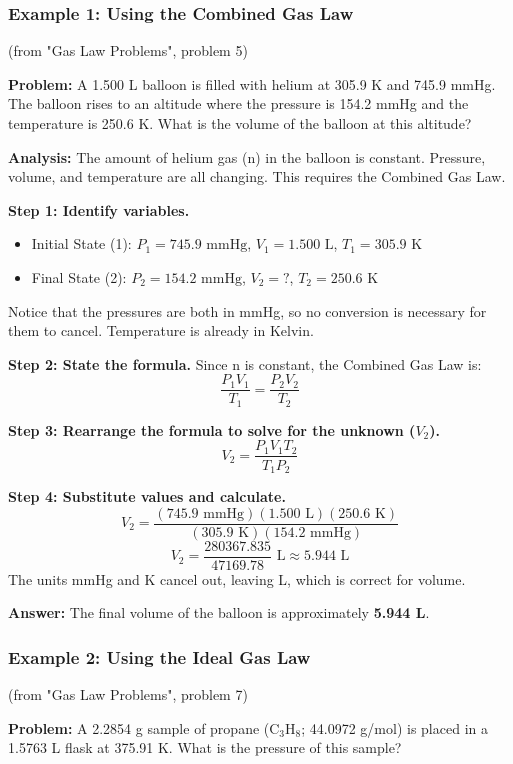\documentclass{article}
\begin{document}
\subsubsection{Example 1: Using the Combined Gas Law}
(from "Gas Law Problems", problem 5)

\textbf{Problem:} A 1.500 L balloon is filled with helium at 305.9 K and 745.9 mmHg. The balloon rises to an altitude where the pressure is 154.2 mmHg and the temperature is 250.6 K. What is the volume of the balloon at this altitude?

\textbf{Analysis:} The amount of helium gas (n) in the balloon is constant. Pressure, volume, and temperature are all changing. This requires the Combined Gas Law.

\textbf{Step 1: Identify variables.}
\begin{itemize}
    \item Initial State (1): $P_1 = 745.9 \text{ mmHg}$, $V_1 = 1.500 \text{ L}$, $T_1 = 305.9 \text{ K}$
    \item Final State (2): $P_2 = 154.2 \text{ mmHg}$, $V_2 = ?$, $T_2 = 250.6 \text{ K}$
\end{itemize}
Notice that the pressures are both in mmHg, so no conversion is necessary for them to cancel. Temperature is already in Kelvin.

\textbf{Step 2: State the formula.}
Since n is constant, the Combined Gas Law is:
\[ \frac{P_1V_1}{T_1} = \frac{P_2V_2}{T_2} \]

\textbf{Step 3: Rearrange the formula to solve for the unknown ($V_2$).}
\[ V_2 = \frac{P_1V_1T_2}{T_1P_2} \]

\textbf{Step 4: Substitute values and calculate.}
\[ V_2 = \frac{(745.9 \text{ mmHg})(1.500 \text{ L})(250.6 \text{ K})}{(305.9 \text{ K})(154.2 \text{ mmHg})} \]
\[ V_2 = \frac{280367.835}{47169.78} \text{ L} \approx 5.944 \text{ L} \]
The units mmHg and K cancel out, leaving L, which is correct for volume.

\textbf{Answer:} The final volume of the balloon is approximately \textbf{5.944 L}.

\subsubsection{Example 2: Using the Ideal Gas Law}
(from "Gas Law Problems", problem 7)

\textbf{Problem:} A 2.2854 g sample of propane (C$_3$H$_8$; 44.0972 g/mol) is placed in a 1.5763 L flask at 375.91 K. What is the pressure of this sample?
\end{document}

